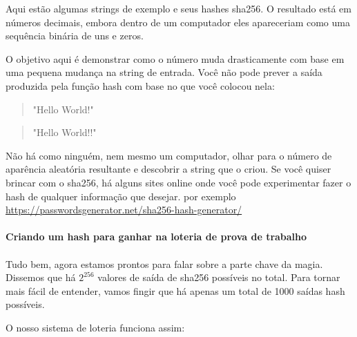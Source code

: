 Aqui estão algumas strings de exemplo e seus hashes sha256. O resultado está em números decimais, embora dentro de um computador eles apareceriam como uma sequência binária de uns e zeros.

O objetivo aqui é demonstrar como o número muda drasticamente com base em uma pequena mudança na string de entrada. Você não pode prever a saída produzida pela função hash com base no que você colocou nela:

\begin{samepage}
\begin{quote}{"Hello World!"\newline
}\end{quote}
\end{samepage}

\begin{samepage}
\begin{quote}{"Hello World!!"\newline
}\end{quote}
\end{samepage}

Não há como ninguém, nem mesmo um computador, olhar para o número de aparência aleatória resultante e descobrir a string que o criou. Se você quiser brincar com o sha256, há alguns sites online onde você pode experimentar fazer o hash de qualquer informação que desejar. por exemplo \url{https://passwordsgenerator.net/sha256-hash-generator/}

\paragraph{Criando um hash para ganhar na loteria de prova de trabalho}
\paragraph{}
 

Tudo bem, agora estamos prontos para falar sobre a parte chave da magia. Dissemos que há \(2^{256}\) valores de saída de sha256 possíveis no total. Para tornar mais fácil de entender, vamos fingir que há apenas um total de 1000 saídas hash possíveis.

O nosso sistema de loteria funciona assim:

